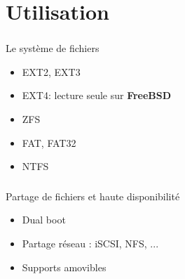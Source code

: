 \section{Utilisation}

\begin{frame}
	\frametitle{\insertsectionhead}
	\begin{block}{Le système de fichiers}
		\begin{itemize}
			\item EXT2, EXT3
			\item EXT4: lecture seule sur \textbf{FreeBSD}
			\item ZFS
			\item FAT, FAT32
			\item NTFS
		\end{itemize}
	\end{block}
\end{frame}

\begin{frame}
	\frametitle{\insertsectionhead}
	\begin{block}{Partage de fichiers et haute disponibilité}
		\begin{itemize}
			\item Dual boot
			\item Partage réseau : iSCSI, NFS, ...
			\item Supports amovibles
		\end{itemize}
	\end{block}
\end{frame}

